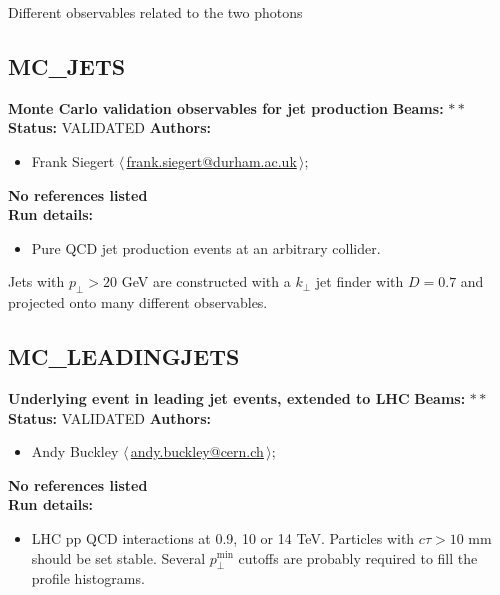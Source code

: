 \noindent Different observables related to the two photons

\clearpage


\clearpage

\subsection{MC\_JETS}
\textbf{Monte Carlo validation observables for jet production}\newline
\textbf{Beams:} $*$\,$*$ \newline
\textbf{Status:} VALIDATED\newline
\textbf{Authors:}
\begin{itemize}
  \item Frank Siegert $\langle\,$\href{mailto:frank.siegert@durham.ac.uk}{frank.siegert@durham.ac.uk}$\,\rangle$;
\end{itemize}
\textbf{No references listed}\\ 
\textbf{Run details:}
\begin{itemize}

  \item Pure QCD jet production events at an arbitrary collider.\end{itemize}

\noindent Jets with $p_\perp>20$ GeV are constructed with a $k_\perp$ jet finder with $D=0.7$ and projected onto many different observables.

\clearpage


\clearpage

\subsection{MC\_LEADINGJETS}
\textbf{Underlying event in leading jet events, extended to LHC}\newline
\textbf{Beams:} $*$\,$*$ \newline
\textbf{Status:} VALIDATED\newline
\textbf{Authors:}
\begin{itemize}
  \item Andy Buckley $\langle\,$\href{mailto:andy.buckley@cern.ch}{andy.buckley@cern.ch}$\,\rangle$;
\end{itemize}
\textbf{No references listed}\\ 
\textbf{Run details:}
\begin{itemize}

  \item LHC pp QCD interactions at 0.9, 10 or 14 TeV. Particles with $c \tau > 10$ mm should be set stable. Several $p_\perp^\text{min}$ cutoffs are probably required to fill the profile histograms.\end{itemize}

